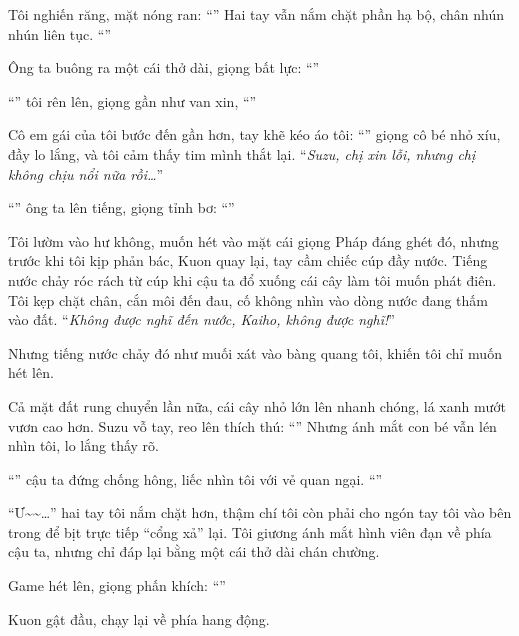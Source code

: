 \documentclass[../main.tex]{subfiles}
\begin{document}
Tôi nghiến răng, mặt nóng ran: ``'' Hai tay vẫn nắm chặt phần hạ bộ, chân nhún nhún liên tục. ``''

Ông ta buông ra một cái thở dài, giọng bất lực: ``''

``'' tôi rên lên, giọng gần như van xin, ``''

Cô em gái của tôi bước đến gần hơn, tay khẽ kéo áo tôi: ``'' giọng cô bé nhỏ xíu, đầy lo lắng, và tôi cảm thấy tim mình thắt lại. ``\textit{Suzu, chị xin lỗi, nhưng chị không chịu nổi nữa rồi\dots}''

``'' ông ta lên tiếng, giọng tỉnh bơ: ``''

Tôi lườm vào hư không, muốn hét vào mặt cái giọng Pháp đáng ghét đó, nhưng trước khi tôi kịp phản bác, Kuon quay lại, tay cầm chiếc cúp đầy nước. Tiếng nước chảy róc rách từ cúp khi cậu ta đổ xuống cái cây làm tôi muốn phát điên. Tôi kẹp chặt chân, cắn môi đến đau, cố không nhìn vào dòng nước đang thấm vào đất. ``\textit{Không được nghĩ đến nước, Kaiho, không được nghĩ!}''

Nhưng tiếng nước chảy đó như muối xát vào bàng quang tôi, khiến tôi chỉ muốn hét lên.

Cả mặt đất rung chuyển lần nữa, cái cây nhỏ lớn lên nhanh chóng, lá xanh mướt vươn cao hơn. Suzu vỗ tay, reo lên thích thú: ``'' Nhưng ánh mắt con bé vẫn lén nhìn tôi, lo lắng thấy rõ.


``'' cậu ta đứng chống hông, liếc nhìn tôi với vẻ quan ngại. ``''

``Ư\~{}\~{}\dots'' hai tay tôi nắm chặt hơn, thậm chí tôi còn phải cho ngón tay tôi vào bên trong để bịt trực tiếp ``cổng xả'' lại. Tôi giương ánh mắt hình viên đạn về phía cậu ta, nhưng chỉ đáp lại bằng một cái thở dài chán chường.

Game hét lên, giọng phấn khích: ``''

Kuon gật đầu, chạy lại về phía hang động.
\end{document}

